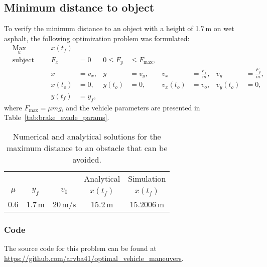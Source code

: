\subsection{Minimum distance to object}
To verify the minimum distance to an object with a height of 1.7\,m on wet asphalt, the following optimization problem was formulated:
\begin{align}
    & \underset{u}{\text{Max}}
    & & & x(t_f)\\
%
    & \text{subject to} 
    & & & F_x &= 0 &0 \leq F_y &\leq F_{\text{max}},\\
%
    &&& & \dot x &= v_x, & \dot y &= v_y, & \dot v_x &= \frac{F_x}{m}, & \dot v_y &= \frac{F_y}{m},\\
%
    &&& & x(t_o) &= 0, & y(t_o) &= 0, & v_x(t_o) &= v_o, & v_y(t_o) &= 0,\\
    &&& & y(t_f) &= y_f,
\end{align}
where $F_{\text{max}} = \mu m g$, and the vehicle parameters are presented in Table~\ref{tab:brake_evade_params}.
\begin{table}[h!]
    \centering
    \begin{tabular}{c|c|c|c|c}
        & & & Analytical & Simulation\\
        $\mu$ & $y_f$ & $v_0$ & $x(t_f)$ & $x(t_f)$ \\
        \hline
        0.6 & 1.7\,m & 20\,m/s & 15.2\,m & 15.2006\,m\\
    \end{tabular}
    \caption{Numerical and analytical solutions for the maximum distance to an obstacle that can be avoided.}
\end{table}
\subsubsection{Code}
The source code for this problem can be found at \newline \href{https://github.com/arvba41/optimal_vehicle_maneuvers/blob/main/uppgift/ugf3/brake_or_evade_p2c.m}{https://github.com/arvba41/optimal\_vehicle\_maneuvers}.